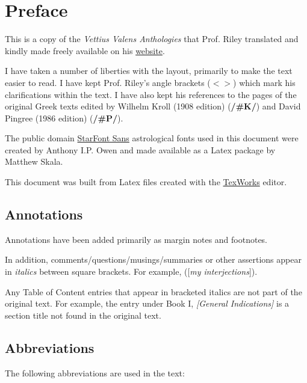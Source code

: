 \chapter{Preface}
This is a copy of the \textit{Vettius Valens Anthologies} that Prof. Riley translated and kindly made freely available on his \href{https://www.csus.edu/indiv/r/rileymt/}{website}.

I have taken a number of liberties with the layout, primarily to make the text easier to read. I have kept Prof. Riley's angle brackets ($< >$) which mark his clarifications within the text. I have also kept his references to the pages of the original Greek texts edited by Wilhelm Kroll (1908 edition) (\textbf{/\#K/}) and David Pingree (1986 edition) (\textbf{/\#P/}). 

The public domain \href{https://www.ctan.org/pkg/starfont}{StarFont Sans} astrological fonts used in this document were created by Anthony I.P. Owen and made available as a Latex package by Matthew Skala. 

This document was built from Latex files created with the \href{https://www.tug.org/texworks/}{TexWorks} editor.

\section{Annotations}

Annotations have been added primarily as margin notes and footnotes. 

In addition, comments/questions/musings/summaries or other assertions appear in \textit{italics} between square brackets. For example, ([\textit{my interjections}]). 

Any Table of Content entries that appear in bracketed italics are not part of the original text. For example, the entry under Book I, \textit{[General Indications]} is a section title not found in the original text.

\section{Abbreviations}
The following abbreviations are used in the text:

